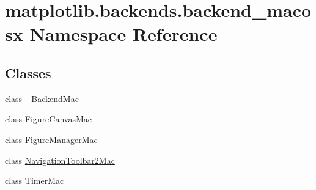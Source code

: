 \hypertarget{namespacematplotlib_1_1backends_1_1backend__macosx}{}\section{matplotlib.\+backends.\+backend\+\_\+macosx Namespace Reference}
\label{namespacematplotlib_1_1backends_1_1backend__macosx}
\subsection*{Classes}
\begin{DoxyCompactItemize}
\item 
class \hyperlink{classmatplotlib_1_1backends_1_1backend__macosx_1_1__BackendMac}{\+\_\+\+Backend\+Mac}
\item 
class \hyperlink{classmatplotlib_1_1backends_1_1backend__macosx_1_1FigureCanvasMac}{Figure\+Canvas\+Mac}
\item 
class \hyperlink{classmatplotlib_1_1backends_1_1backend__macosx_1_1FigureManagerMac}{Figure\+Manager\+Mac}
\item 
class \hyperlink{classmatplotlib_1_1backends_1_1backend__macosx_1_1NavigationToolbar2Mac}{Navigation\+Toolbar2\+Mac}
\item 
class \hyperlink{classmatplotlib_1_1backends_1_1backend__macosx_1_1TimerMac}{Timer\+Mac}
\end{DoxyCompactItemize}
